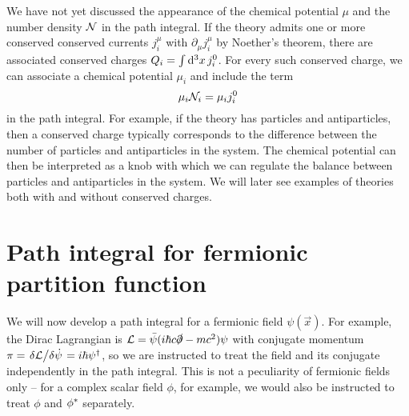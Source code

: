 We have not yet discussed the appearance of the chemical potential $\mu$ and the number density $\mathcal{N}$ in the path integral.
If the theory admits one or more conserved conserved currents $j_i^\mu$ with $\partial_\mu j_i^\mu$ by Noether's theorem, there are associated conserved charges $Q_i = \int \mathop{}\!\mathrm{d}^3 x \, j_i^0$.
For every such conserved charge, we can associate a chemical potential $\mu_i$ and include the term
\begin{equation}
	\mu_i \mathcal{N}_i = \mu_i j_i^0
\label{eq:tft:chemical_potential}
\end{equation}
in the path integral.
For example, if the theory has particles and antiparticles, then a conserved charge typically corresponds to the difference between the number of particles and antiparticles in the system.
The chemical potential can then be interpreted as a knob with which we can regulate the balance between particles and antiparticles in the system.
We will later see examples of theories both with and without conserved charges.


\section{Path integral for fermionic partition function}

\newcommand\creat{\hat\psi^\dagger}
\newcommand\destr{\hat\psi        }

We will now develop a path integral for a fermionic field $\psi(\vec{x})$.
For example, the Dirac Lagrangian is $\mathcal{L} = \bar{\psi} (i \hbar c \slashed\partial - m c^2) \psi$ with conjugate momentum $\pi = \fdv{\lagr}/{\dot\psi} = i \hbar \psi^\dagger$, so we are instructed to treat the field and its conjugate independently in the path integral.
This is not a peculiarity of fermionic fields only -- for a complex scalar field $\phi$, for example, we would also be instructed to treat $\phi$ and ${\phi}^*$ separately. 


